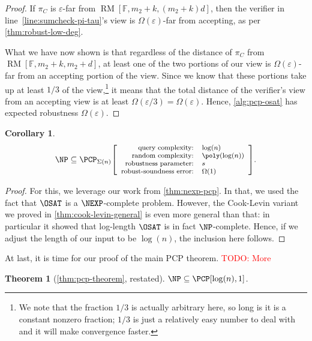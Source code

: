 \documentclass[english,12pt]{reedthesis}
\theoremstyle{plain}
\newtheorem{thm}{Theorem}[section]
\newtheorem{cor}[cor]{Corollary}
\theoremstyle{definition}
\theoremstyle{remark}
\DeclareMathOperator{\RM}{RM}
\newcommand{\pcpr}[4]{%
  \ensuremath%
  \mleft[{\footnotesize\begin{array}{r l}
    \text{query complexity:} & #1 \\
    \text{random complexity:} & #2 \\
    \text{robustness parameter:} & #3 \\
    \text{robust-soundness error:} & #4
  \end{array}}\mright]%
}
\newcommand{\TODO}[1]{\textcolor{red}{TODO: #1}}
\begin{document}
\begin{proof}
  If $\pi_{C}$ is $\varepsilon$-far from $\RM[\mathbb{F}, m_{2}+k, (m_{2}+k)d]$, then the
  verifier in line~\ref{line:sumcheck-pi-tau}'s view is $\Omega(\varepsilon)$-far from accepting, as per
  \cref{thm:robust-low-deg}.

  What we have now shown is that regardless of the distance of $\pi_{C}$ from
  $\RM[\mathbb{F}, m_{2}+k, m_{2}+d]$, at least one of the two portions of our
  view is $\Omega(\varepsilon)$-far from an accepting portion of the view. Since we know that
  these portions take up at least $1/3$ of the view,\footnote{We note that the
    fraction $1/3$ is actually arbitrary here, so long is it is a constant
    nonzero fraction; $1/3$ is just a relatively easy number to deal with and it
    will make convergence faster.} it means that the total distance of the
  verifier's view from an accepting view is at least $\Omega(\varepsilon/3) = \Omega(\varepsilon)$. Hence,
  \cref{alg:pcp-osat} has expected robustness $\Omega(\varepsilon)$.
\end{proof}

\begin{cor}\label{cor:np-pcp}
  \begin{equation}\label{eqn:np-subseteq-pzkpcp}
    \NP \subseteq \PCP_{\Sigma(n)}\pcpr{\log(n)}{\poly(\log(n))}{s}{\Omega(1)}.
  \end{equation}
\end{cor}

\begin{proof}
  For this, we leverage our work from \cref{thm:nexp-pcp}. In that, we used the
  fact that $\OSAT$ is a $\NEXP$-complete problem. However, the Cook-Levin
  variant we proved in \cref{thm:cook-levin-general} is even more general than
  that: in particular it showed that log-length $\OSAT$ is in fact
  $\NP$-complete. Hence, if we adjust the length of our input to be $\log(n)$,
  the inclusion here follows.
\end{proof}

At last, it is time for our proof of the main PCP theorem. \TODO{More}

\begin{thm}[{\cref{thm:pcp-theorem}, restated}]
  $\NP \subseteq \PCP[\log(n), 1]$.
\end{thm}
\end{document}
